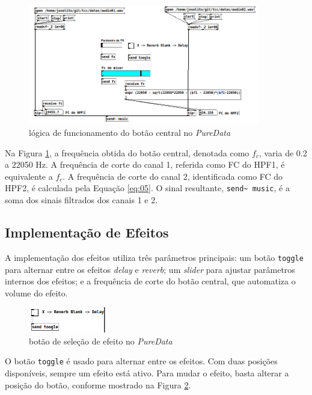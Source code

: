 \begin{figure}[h]
    \centering
    \includegraphics[width=0.9\textwidth]{figuras/fig44.png}
    \caption{lógica de funcionamento do botão central no \textit{PureData}}
    \label{fig44}
\end{figure}

Na Figura \ref{fig44}, a frequência obtida do botão central, denotada como \( f_c \), varia de 0.2 a 22050 Hz. A frequência de corte do canal 1, referida como FC do HPF1, é equivalente a \( f_c \). A frequência de corte do canal 2, identificada como FC do HPF2, é calculada pela Equação \ref{eq:05}. O sinal resultante, \texttt{send\textasciitilde\ music}, é a soma dos sinais filtrados dos canais 1 e 2.

\newpage
\subsection{Implementação de Efeitos}

A implementação dos efeitos utiliza três parâmetros principais: um botão \texttt{toggle} para alternar entre os efeitos \textit{delay} e \textit{reverb}; um \textit{slider} para ajustar parâmetros internos dos efeitos; e a frequência de corte do botão central, que automatiza o volume do efeito.

\begin{figure}[h]
    \centering
    \includegraphics[width=0.3\textwidth]{figuras/fig46.png}
    \caption{botão de seleção de efeito no \textit{PureData}}
    \label{fig46}
\end{figure}

O botão \texttt{toggle} é usado para alternar entre os efeitos. Com duas posições disponíveis, sempre um efeito está ativo. Para mudar o efeito, basta alterar a posição do botão, conforme mostrado na Figura \ref{fig46}.


